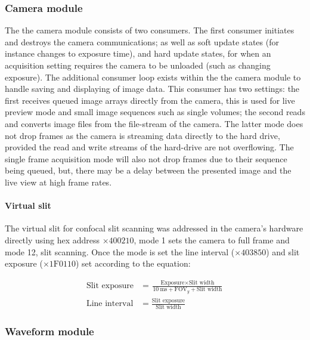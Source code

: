 \subsubsection{Camera module}

The the camera module consists of two consumers.
The first
consumer initiates and destroys the camera communications; as well as
soft update states (for instance changes to exposure time), and hard update states, for when an acquisition setting requires the camera to be unloaded (such as changing exposure).
The additional consumer loop exists within the the camera module to handle saving and displaying of image data.
This consumer has two settings: the first receives queued image arrays directly from the camera, this is used for live preview mode and small image sequences such as single volumes; the second reads and converts image files from the file-stream of the camera.
The latter mode does not drop frames as the camera is streaming data directly to the hard drive, provided the read and write streams of the hard-drive are not overflowing.
The single frame acquisition mode will also not drop frames due to their sequence being queued, but, there may be a delay between the presented image and the live view at high frame rates.

\paragraph{Virtual slit}

The virtual slit for confocal slit scanning was addressed in the camera's hardware directly using hex address \(\times 400210\), mode 1 sets the camera to full frame and mode 12, slit scanning.
Once the mode is set the line interval (\(\times 403850\)) and slit exposure (\(\times \text{1F0110}\)) set according to the equation:

\begin{align}
    \text{Slit exposure} &= \frac{\text{Exposure} \times \text{Slit width}}{\SI{10}{\milli\second} + \text{FOV}_y + \text{Slit width}}\nonumber \\
    \text{Line interval} &= \frac{\text{Slit exposure}}{\text{Slit width}}\nonumber
\end{align}

\subsubsection{Waveform module}

